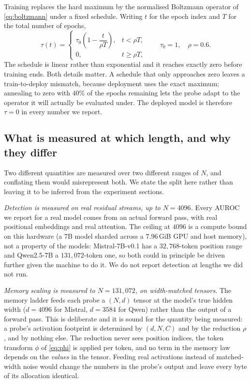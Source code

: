 \documentclass[10pt]{article}
\theoremstyle{plain}
\theoremstyle{definition}
\theoremstyle{remark}
\begin{document}
Training replaces the hard maximum by the normalised Boltzmann operator of
\eqref{eq:boltzmann} under a fixed schedule. Writing $t$ for the epoch index and $T$ for the
total number of epochs,
\begin{equation}
  \tau(t)=
  \begin{cases}
    \tau_0\left(1-\dfrac{t}{\rho T}\right), & t<\rho T,\\[6pt]
    0, & t\ge \rho T,
  \end{cases}
  \qquad \tau_0=1,\quad \rho=0.6 .
  \label{eq:schedule}
\end{equation}
The schedule is linear rather than exponential and it reaches exactly zero before
training ends. Both details matter. A schedule that only approaches zero leaves a
train-to-deploy mismatch, because deployment uses the exact maximum; annealing to zero
with $40\%$ of the epochs remaining lets the probe adapt to the operator it will actually
be evaluated under. The deployed model is therefore $\tau=0$ in every number we report.

\subsection{What is measured at which length, and why they differ}
\label{sec:lengthprotocol}

Two different quantities are measured over two different ranges of $N$, and conflating
them would misrepresent both. We state the split here rather than leaving it to be
inferred from the experiment sections.

\emph{Detection is measured on real residual streams, up to $N{=}4096$.} Every AUROC we
report for a real model comes from an actual forward pass, with real positional
embeddings and real attention. The ceiling at $4096$ is a compute bound on this hardware
(a $7$B model sharded across a $7.96$\,GiB GPU and host memory), not a property of the
models: Mistral-7B-v0.1 has a $32{,}768$-token position range and Qwen2.5-7B a
$131{,}072$-token one, so both could in principle be driven further given the machine to
do it. We do not report detection at lengths we did not run.

\emph{Memory scaling is measured to $N{=}131{,}072$, on width-matched tensors.} The
memory ladder feeds each probe a $(N,d)$ tensor at the model's true hidden width
($d{=}4096$ for Mistral, $d{=}3584$ for Qwen) rather than the output of a forward pass.
This is deliberate and it is sound for the quantity being measured: a probe's activation
footprint is determined by $(d, N, C)$ and by the reduction $\rho$, and by nothing else.
The reduction never sees position indices, the token transform $\phi$ of \eqref{eq:phi}
is applied per token, and no term in the memory law depends on the \emph{values} in the
tensor. Feeding real activations instead of matched-width noise would change the numbers
in the probe's output and leave every byte of its allocation identical.
\end{document}
